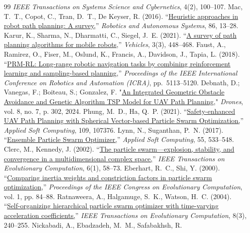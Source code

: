 \documentclass[final,5p,times]{elsarticle}
\begin{document}
\begin{table}[t]
{\begin{thebibliography}{99}
\textit{IEEE Transactions on Systems Science and Cybernetics}, 4(2), 100--107. 
Mac, T.~T., Copot, C., Tran, D.~T., De Keyser, R.
(2016).
``\href{https://doi.org/10.1016/j.robot.2016.08.001}{Heuristic approaches in robot path planning: A survey,}''
\textit{Robotics and Autonomous Systems}, 86, 13--28. 
Karur, K., Sharma, N., Dharmatti, C., Siegel, J.~E.
(2021).
``\href{https://doi.org/10.3390/vehicles3030027}{A survey of path planning algorithms for mobile robots,}''
\textit{Vehicles}, 3(3), 448--468. 
Faust, A., Ramirez, O., Fiser, M., Oslund, K., Francis, A., Davidson, J., Tapia, L.
(2018).
``\href{https://doi.org/10.1109/ICRA.2018.8461096}{PRM-RL: Long-range robotic navigation tasks by combining reinforcement learning and sampling-based planning,}''
\textit{Proceedings of the IEEE International Conference on Robotics and Automation (ICRA)}, pp.~5113--5120. 
Debnath, D.; Vanegas, F.; Boiteau, S.; Gonzalez, F.
"\href{https://doi.org/10.3390/drones8070302}{An Integrated Geometric Obstacle Avoidance and Genetic Algorithm TSP Model for UAV Path Planning,}" \textit{Drones}, vol. 8, no. 7, p. 302, 2024. 
Phung, M.~D., Ha, Q.~P.
(2021).
``\href{https://doi.org/10.1016/j.asoc.2021.107376}{Safety-enhanced UAV Path Planning with Spherical Vector-based Particle Swarm Optimization,}''
\textit{Applied Soft Computing}, 109, 107376. 
Lynn, N., Suganthan, P.~N.
(2017).
``\href{https://doi.org/10.1016/j.asoc.2017.02.007}{Ensemble Particle Swarm Optimizer,}''
\textit{Applied Soft Computing}, 55, 533--548. 
Clerc, M., Kennedy, J.
(2002).
``\href{https://doi.org/10.1109/4235.985692}{The particle swarm---explosion, stability, and convergence in a multidimensional complex space,}''
\textit{IEEE Transactions on Evolutionary Computation}, 6(1), 58--73. 
Eberhart, R.~C., Shi, Y.
(2000).
``\href{https://doi.org/10.1109/CEC.2000.870279}{Comparing inertia weights and constriction factors in particle swarm optimization,}''
\textit{Proceedings of the IEEE Congress on Evolutionary Computation}, vol. 1, pp. 84--88. 
Ratnaweera, A., Halgamuge, S.~K., Watson, H.~C.
(2004).
``\href{https://doi.org/10.1109/tevc.2004.826071}{Self-organizing hierarchical particle swarm optimizer with time-varying acceleration coefficients,}''
\textit{IEEE Transactions on Evolutionary Computation}, 8(3), 240--255. 
Nickabadi, A., Ebadzadeh, M.~M., Safabakhsh, R.

\end{thebibliography}}
\end{table}
\end{document}
